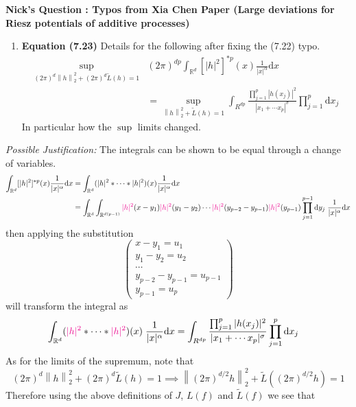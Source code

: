 \documentclass[a4paper,11pt]{article}
\numberwithin{equation}{section}
\theoremstyle{plain}
\theoremstyle{definition}
\newcommand{\ud}{\ensuremath{\mathrm{d} }}
\newcommand{\Norm}[1]{\left\|  #1   \right\|}
\newcommand{\R}{\mathbb{R}}
\newcounter{NQ}
\newenvironment{NickQuestion}[1][] %
{\refstepcounter{NQ}
	\begin{mdframed}[backgroundcolor=lightgray]\textbf{Nick's Question \theNQ \: #1~~}~~~\noindent}%
	{\end{mdframed}}
\numberwithin{NQ}{section}
\numberwithin{LQ}{section}
\numberwithin{ZQ}{section}
\begin{document}
\begin{NickQuestion}[ : Typos from Xia Chen Paper (Large deviations for Riesz potentials of additive processes) ]
\begin{enumerate}
			\item \textbf{Equation (7.23)} Details for the following after fixing the (7.22) typo.
			\begin{align*}
			\sup_{(2\pi)^d \Norm{h}_2^2 + (2\pi)^d \tilde{L}(h) =1} &	(2\pi)^{dp} \int_{\R^d} [ |h|^2 ]^{*p}(x) \frac{1}{|x|^\alpha} \ud x
			\\ &= \sup_{\Norm{h}_2^2 + \tilde{L}(h) =1} \int_{R^{dp}} \frac{\prod_{j = 1}^p |h(x_j)|^2}{|x_1+ \cdots x_p|^{\sigma}} \prod_{j = 1}^p \ud x_j
			\end{align*}
			In particular how the $\sup$ limits changed.
		\end{enumerate}
		\textit{Possible Justification:}
		The integrals can be shown to be equal through a change of variables.
		\begin{align*}
		\int_{\R^d} [ |h|^2 ]^{*p}(x) \frac{1}{|x|^\alpha} \ud x
		&= \int_{\R^d} (|h|^2*\cdots*|h|^2)(x) \frac{1}{|x|^\alpha} \ud x \\
		&= \int_{\R^d} \int_{\R^{d(p-1)}} \textcolor{magenta}{|h|^2}(x-y_1)\textcolor{magenta}{|h|^2}(y_1-y_2)\cdots \textcolor{magenta}{|h|^2}(y_{p-2}-y_{p-1})\textcolor{magenta}{|h|^2}(y_{p-1}) \prod_{j =1}^{p-1}\ud y_j \; \frac{1}{|x|^\alpha} \ud x
		\end{align*}
		then applying the substitution
		\[
		\begin{pmatrix}
		x-y_1 = u_1
		\\ y_1-y_2 = u_2
		\\ \cdots
		\\ y_{p-2} - y_{p-1} = u_{p-1}
		\\ y_{p-1} = u_p
		\end{pmatrix}
		\]
		will transform the integral as
		\begin{align*}
		\int_{\R^d} (\textcolor{magenta}{|h|^2}*\cdots*\textcolor{magenta}{|h|^2})(x) \; \frac{1}{|x|^\alpha} \ud x &= \int_{R^{dp}} \frac{\prod_{j = 1}^p |h(x_j)|^2}{|x_1+ \cdots x_p|^{\sigma}} \prod_{j = 1}^p \ud x_j
		\end{align*}
		As for the limits of the supremum, note that
		\[
		(2\pi)^d \Norm{h}_2^2 + (2\pi)^d \tilde{L}(h) =1 \implies \Norm{(2\pi)^{d/2} h}_2^2 +  \tilde{L}((2\pi)^{d/2} h) =1
		\]
		Therefore using the above definitions of $J$, $L(f)$ and $\tilde{L}(f)$ we see that


\end{NickQuestion}
\end{document}
